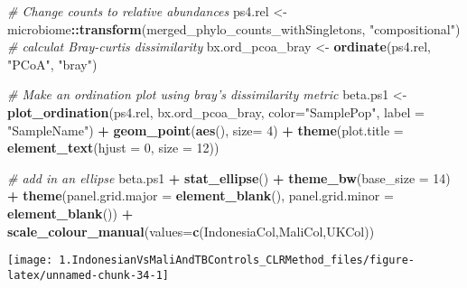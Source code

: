 \documentclass[]{article}
\newenvironment{Shaded}{\begin{snugshade}}{\end{snugshade}}
\newcommand{\CommentTok}[1]{\textcolor[rgb]{0.56,0.35,0.01}{\textit{#1}}}
\newcommand{\DataTypeTok}[1]{\textcolor[rgb]{0.13,0.29,0.53}{#1}}
\newcommand{\DecValTok}[1]{\textcolor[rgb]{0.00,0.00,0.81}{#1}}
\newcommand{\KeywordTok}[1]{\textcolor[rgb]{0.13,0.29,0.53}{\textbf{#1}}}
\newcommand{\NormalTok}[1]{#1}
\newcommand{\OperatorTok}[1]{\textcolor[rgb]{0.81,0.36,0.00}{\textbf{#1}}}
\newcommand{\StringTok}[1]{\textcolor[rgb]{0.31,0.60,0.02}{#1}}
\begin{document}
\begin{Shaded}
\begin{Highlighting}[]
\CommentTok{# Change counts to relative abundances}
\NormalTok{ps4.rel <-}\StringTok{ }\NormalTok{microbiome}\OperatorTok{::}\KeywordTok{transform}\NormalTok{(merged_phylo_counts_withSingletons, }\StringTok{"compositional"}\NormalTok{)}
\CommentTok{# calculat Bray-curtis dissimilarity}
\NormalTok{bx.ord_pcoa_bray <-}\StringTok{ }\KeywordTok{ordinate}\NormalTok{(ps4.rel, }\StringTok{"PCoA"}\NormalTok{, }\StringTok{"bray"}\NormalTok{)}

\CommentTok{# Make an ordination plot using bray's dissimilarity metric}
\NormalTok{beta.ps1 <-}\StringTok{ }\KeywordTok{plot_ordination}\NormalTok{(ps4.rel, }
\NormalTok{                            bx.ord_pcoa_bray, }
                            \DataTypeTok{color=}\StringTok{"SamplePop"}\NormalTok{, }
                            \DataTypeTok{label =} \StringTok{"SampleName"}\NormalTok{) }\OperatorTok{+}\StringTok{ }
\StringTok{  }\KeywordTok{geom_point}\NormalTok{(}\KeywordTok{aes}\NormalTok{(), }\DataTypeTok{size=} \DecValTok{4}\NormalTok{) }\OperatorTok{+}\StringTok{ }
\StringTok{  }\KeywordTok{theme}\NormalTok{(}\DataTypeTok{plot.title =} \KeywordTok{element_text}\NormalTok{(}\DataTypeTok{hjust =} \DecValTok{0}\NormalTok{, }\DataTypeTok{size =} \DecValTok{12}\NormalTok{))}

\CommentTok{# add in an ellipse}
\NormalTok{beta.ps1 }\OperatorTok{+}\StringTok{ }\KeywordTok{stat_ellipse}\NormalTok{() }\OperatorTok{+}\StringTok{ }\KeywordTok{theme_bw}\NormalTok{(}\DataTypeTok{base_size =} \DecValTok{14}\NormalTok{) }\OperatorTok{+}\StringTok{ }
\StringTok{  }\KeywordTok{theme}\NormalTok{(}\DataTypeTok{panel.grid.major =} \KeywordTok{element_blank}\NormalTok{(), }\DataTypeTok{panel.grid.minor =} \KeywordTok{element_blank}\NormalTok{()) }\OperatorTok{+}
\StringTok{  }\KeywordTok{scale_colour_manual}\NormalTok{(}\DataTypeTok{values=}\KeywordTok{c}\NormalTok{(IndonesiaCol,MaliCol,UKCol))}
\end{Highlighting}
\end{Shaded}

\begin{center}\texttt{[image: 1.IndonesianVsMaliAndTBControls\_CLRMethod\_files/figure-latex/unnamed-chunk-34-1]} \end{center}
\end{document}
